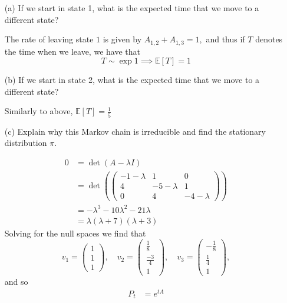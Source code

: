 \documentclass[11pt]{article}
\newcommand{\bbE}{\mathbb{E}}
\begin{document}
\begin{enumerate}
    \item[(a)] If we start in state 1, what is the expected time that we move to a different state?
    \begin{solution}
        The rate of leaving state $1$ is given by $A_{1,2} + A_{1,3} = 1,$ and thus if $T$ denotes the time when we leave, we have that \[T \sim \exp{1} \implies \bbE[T] = 1\]
    \end{solution}
    \item[(b)] If we start in state 2, what is the expected time that we move to a different state?
\begin{solution}
    Similarly to above, $\bbE[T] = \frac{1}{5}$
\end{solution}
    \item[(c)] Explain why this Markov chain is irreducible and find the stationary distribution \(\pi\).
\begin{solution}
    \begin{align*}
         0 &= \det(A - \lambda I)\\
         &= \det(\begin{pmatrix}
             -1 - \lambda & 1 & 0\\
             4 & -5 - \lambda & 1\\
             0 & 4 & -4 - \lambda
         \end{pmatrix})\\
         &= -\lambda^3 - 10\lambda^2 - 21\lambda \\
         &= \lambda(\lambda + 7)(\lambda +3)
    \end{align*}
    Solving for the null spaces we find that 
    \[v_1 = \begin{pmatrix}
        1\\1\\1
    \end{pmatrix}, \quad v_2 = \begin{pmatrix}
        \frac{1}{8} \\
        \frac{-3}{4}\\
        1
    \end{pmatrix}, \quad v_3 = \begin{pmatrix}
        -\frac{1}{8}\\
        \frac{1}{4}\\
        1
    \end{pmatrix},\] and so 
    \begin{align*}
        P_t &= e^{tA}\\

\end{align*}
\end{solution}
\end{enumerate}
\end{document}
